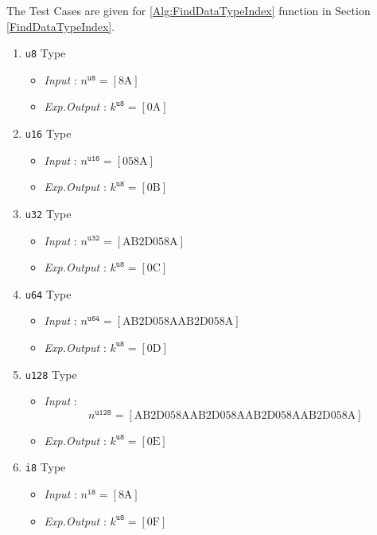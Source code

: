 \documentclass[../alan-handbook.tex]{subfiles}
\begin{document}
The Test Cases are given for  \ref{Alg:FindDataTypeIndex} function in Section \ref{FindDataTypeIndex}.

\begin{enumerate}
    \item \texttt{u8} Type
        \begin{itemize}
            \item \textit{Input} : $n^{\texttt{u8}} = [\text{8A}]$
            \item \textit{Exp.Output} : $k^{\texttt{u8}} = [\text{0A}]$
        \end{itemize}
    \item \texttt{u16} Type
        \begin{itemize}
            \item \textit{Input} : $n^{\texttt{u16}} = [\text{058A}]$
            \item \textit{Exp.Output} : $k^{\texttt{u8}} = [\text{0B}]$
        \end{itemize}
    \item \texttt{u32} Type
        \begin{itemize}
            \item \textit{Input} : $n^{\texttt{u32}} = [\text{AB2D058A}]$
            \item \textit{Exp.Output} : $k^{\texttt{u8}} = [\text{0C}]$
        \end{itemize}
    \item \texttt{u64} Type
        \begin{itemize}
            \item \textit{Input} : $n^{\texttt{u64}} = [\text{AB2D058AAB2D058A}]$
            \item \textit{Exp.Output} : $k^{\texttt{u8}} = [\text{0D}]$
        \end{itemize}
    \item \texttt{u128} Type
        \begin{itemize}
            \item \textit{Input} : $$n^{\texttt{u128}} = [\text{AB2D058AAB2D058AAB2D058AAB2D058A}]$$
            \item \textit{Exp.Output} : $k^{\texttt{u8}} = [\text{0E}]$
        \end{itemize}
        \item \texttt{i8} Type
        \begin{itemize}
            \item \textit{Input} : $n^{\texttt{i8}} = [\text{8A}]$
            \item \textit{Exp.Output} : $k^{\texttt{u8}} = [\text{0F}]$

\end{itemize}
\end{enumerate}
\end{document}
